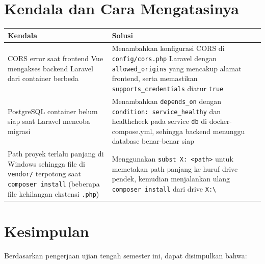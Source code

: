 \documentclass[12pt,letterpaper]{report}
\begin{document}
\section{Kendala dan Cara Mengatasinya}

\begin{longtable}{@{}p{}p{}@{}}
\toprule
\textbf{Kendala} & \textbf{Solusi} \\
\midrule
\endhead
CORS error saat frontend Vue mengakses backend Laravel dari container berbeda &
Menambahkan konfigurasi CORS di \texttt{config/cors.php} Laravel dengan \texttt{allowed\_origins} yang mencakup alamat frontend, serta memastikan \texttt{supports\_credentials} diatur \texttt{true} \\[8pt]

PostgreSQL container belum siap saat Laravel mencoba migrasi &
Menambahkan \texttt{depends\_on} dengan \texttt{condition: service\_healthy} dan healthcheck pada service \texttt{db} di docker-compose.yml, sehingga backend menunggu database benar-benar siap \\[8pt]

Path proyek terlalu panjang di Windows sehingga file di \texttt{vendor/} terpotong saat \texttt{composer install} (beberapa file kehilangan ekstensi \texttt{.php}) &
Menggunakan \texttt{subst X: \textless{}path\textgreater{}} untuk memetakan path panjang ke huruf drive pendek, kemudian menjalankan ulang \texttt{composer install} dari drive \texttt{X:\textbackslash{}} \\
\bottomrule
\end{longtable}

\section{Kesimpulan}

Berdasarkan pengerjaan ujian tengah semester ini, dapat disimpulkan bahwa:
\end{document}
